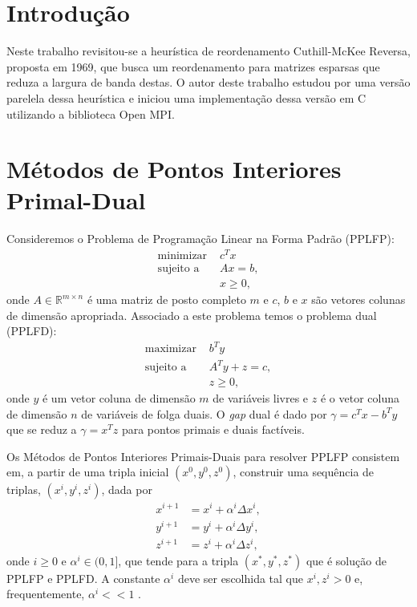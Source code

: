 \section{Introdução}
Neste trabalho revisitou-se a heurística de reordenamento Cuthill-McKee Reversa,
proposta em 1969, que busca um reordenamento para matrizes esparsas que reduza a
largura de banda destas. O autor deste trabalho estudou por uma versão parelela
dessa heurística e iniciou uma implementação dessa versão em C utilizando a
biblioteca Open MPI.

\section{Métodos de Pontos Interiores Primal-Dual}
Consideremos o Problema de Programação Linear na Forma Padrão (PPLFP):
\begin{align*}
    \text{minimizar } & c^T x \\
    \text{sujeito a } & A x = b, \\
    & x \geq 0,
\end{align*}
onde $A \in \mathbb{R}^{m \times n}$ é uma matriz de posto completo $m$ e $c$,
$b$ e $x$ são vetores colunas de dimensão apropriada. Associado a este problema
temos o problema dual (PPLFD):
\begin{align*}
    \text{maximizar } & b^T y \\
    \text{sujeito a } & A^T y + z = c, \\
    & z \geq 0,
\end{align*}
onde $y$ é um vetor coluna de dimensão $m$ de variáveis livres e $z$ é o vetor
coluna de dimensão $n$ de variáveis de folga duais. O \textit{gap} dual é dado
por $\gamma = c^T x - b^T y$ que se reduz a $\gamma = x^T z$ para pontos primais
e duais factíveis.

Os Métodos de Pontos Interiores Primais-Duais para resolver PPLFP consistem em, a
partir de uma tripla inicial $(x^0, y^0, z^0)$, construir uma
sequência de triplas, $(x^i, y^i, z^i)$, dada por
\begin{align*}
    x^{i + 1} &= x^i + \alpha^i \Delta x^i, \\
    y^{i + 1} &= y^i + \alpha^i \Delta y^i, \\
    z^{i + 1} &= z^i + \alpha^i \Delta z^i,
\end{align*}
onde $i \geq 0$ e $\alpha^i \in (0, 1]$, que tende para a tripla $(x^*, y^*, z^*)$ que é
solução de PPLFP e PPLFD. A constante $\alpha^i$ deve ser escolhida tal que $x^i,
z^i > 0$ e, frequentemente, $\alpha^i << 1$ \cite{Wright:1987:PrimalDualIP}.

